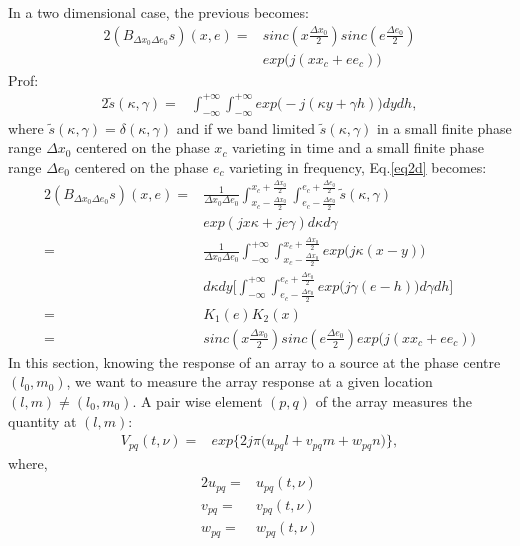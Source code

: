 In a two dimensional case, the previous becomes:
\begin{alignat}{2}
(B_{\Delta x_0 \Delta e_0}s)(x,e)=&sinc (x\frac{\Delta x_0}{2})sinc(e\frac{\Delta e_0}{2})\\
				  &exp\big(j (xx_c+ee_c)\big)
\end{alignat}
Prof:
\begin{alignat}{2}
\tilde{s}(\kappa,\gamma) =& \int_{-\infty}^{+\infty}\int_{-\infty}^{+\infty}exp\big(-j(\kappa y+\gamma h)\big)dydh, \label{eq2d}
\end{alignat}
where $\tilde{s}(\kappa,\gamma)=\delta(\kappa,\gamma)$ and if we band limited $\tilde{s}(\kappa,\gamma)$ in a small finite phase range  
$\Delta x_0$ centered on the phase $x_c$ varieting in time and a small finite phase range  
$\Delta e_0$ centered on the phase $e_c$ varieting in frequency, Eq.\ref{eq2d} becomes:\\
\begin{alignat*}{2}
(B_{\Delta x_0\Delta e_0}s)(x,e) =& \frac{1}{\Delta x_0\Delta e_0}\int_{x_c-\frac{\Delta x_0}{2}}^{x_c+\frac{\Delta 
x_0}{2}}\int_{e_c-\frac{\Delta e_0}{2}}^{e_c+\frac{\Delta e_0}{2}}\tilde{s}(\kappa,\gamma)\\
				  &exp(jx\kappa+je\gamma)d\kappa d\gamma\\
		     =& \frac{1}{\Delta x_0 \Delta e_0}\int_{-\infty}^{+\infty}\int_{x_c-\frac{\Delta x_0}{2}}^{x_c+\frac{\Delta 
x_0}{2}}exp\big(j\kappa(x-y)\big)\\
		      &d\kappa dy \bigg[\int_{-\infty}^{+\infty}\int_{e_c-\frac{\Delta e_0}{2}}^{e_c+\frac{\Delta 
e_0}{2}}exp\big(j\gamma(e-h)\big)d\gamma dh\bigg]\\
		     =&K_1(e)K_2(x)\\
		     =&sinc (x\frac{\Delta x_0}{2})sinc(e\frac{\Delta e_0}{2})exp\big(j (xx_c+ee_c)\big)
\end{alignat*}
In this section, knowing the response of an array to a source at the phase centre $(l_0,m_0)$, we want to measure the array response at a 
given location $(l,m)\neq(l_0,m_0)$.  A pair wise element $(p,q)$ of the array   measures the quantity at $(l,m)$:
\begin{eqnarray}
 V_{pq}(t, \nu)=& exp\bigg\{2j\pi\big(u_{pq}l+v_{pq}m+ w_{pq}n\big)\bigg\}\label{eq233},
\end{eqnarray}
where,
\begin{alignat}{2}
u_{pq}=&u_{pq}(t,\nu)\\
v_{pq}=&v_{pq}(t,\nu)\\
w_{pq}=&w_{pq}(t,\nu)
\end{alignat}
